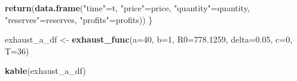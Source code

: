 \documentclass[
]{article}
\newenvironment{Shaded}{\begin{snugshade}}{\end{snugshade}}
\newcommand{\AttributeTok}[1]{\textcolor[rgb]{0.13,0.29,0.53}{#1}}
\newcommand{\DecValTok}[1]{\textcolor[rgb]{0.00,0.00,0.81}{#1}}
\newcommand{\FloatTok}[1]{\textcolor[rgb]{0.00,0.00,0.81}{#1}}
\newcommand{\FunctionTok}[1]{\textcolor[rgb]{0.13,0.29,0.53}{\textbf{#1}}}
\newcommand{\NormalTok}[1]{#1}
\newcommand{\OtherTok}[1]{\textcolor[rgb]{0.56,0.35,0.01}{#1}}
\newcommand{\StringTok}[1]{\textcolor[rgb]{0.31,0.60,0.02}{#1}}
\begin{document}
\begin{Shaded}
\begin{Highlighting}[]
  \FunctionTok{return}\NormalTok{(}\FunctionTok{data.frame}\NormalTok{(}\StringTok{"time"}\OtherTok{=}\NormalTok{t, }\StringTok{"price"}\OtherTok{=}\NormalTok{price, }\StringTok{"quantity"}\OtherTok{=}\NormalTok{quantity, }\StringTok{"reserves"}\OtherTok{=}\NormalTok{reserves, }\StringTok{"profits"}\OtherTok{=}\NormalTok{profits))}
\NormalTok{\}}

\NormalTok{exhaust\_a\_df }\OtherTok{\textless{}{-}} \FunctionTok{exhaust\_func}\NormalTok{(}\AttributeTok{a=}\DecValTok{40}\NormalTok{, }\AttributeTok{b=}\DecValTok{1}\NormalTok{, }\AttributeTok{R0=}\FloatTok{778.1259}\NormalTok{, }\AttributeTok{delta=}\FloatTok{0.05}\NormalTok{, }\AttributeTok{c=}\DecValTok{0}\NormalTok{, }\AttributeTok{T=}\DecValTok{36}\NormalTok{)}

\FunctionTok{kable}\NormalTok{(exhaust\_a\_df)}
\end{Highlighting}
\end{Shaded}
\end{document}

